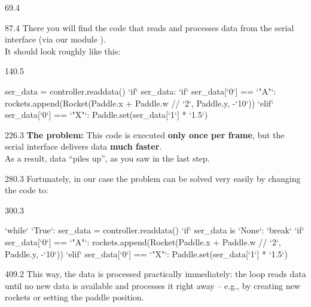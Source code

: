\documentclass{aslab}
\newcommand*\Kw[1]{\textcolor{codeorange}{#1}}  %
\newcommand*\Cy[1]{\textcolor{codecyan}{#1}}    %
\newcommand*\Nu[1]{\textcolor{codered}{#1}}     %
\begin{document}
\nextpage
\begin{region}{69.4}
\end{region}

\begin{region}[pitch=13.2]{87.4}
There you will find the code that reads and processes data from the serial
interface (via our module ).\\
It should look roughly like this:
\end{region}

\begin{region}[pitch=12]{140.5}
\begin{codeblock}[escapechar=`]
ser_data = controller.readdata()
`\Kw{if}` ser_data:
    `\Kw{if}` ser_data[`\Nu{0}`] == `\Nu{"A"}`:
        rockets.append(Rocket(Paddle.x + Paddle.w // `\Nu{2}`, Paddle.y, -`\Nu{10}`))
    `\Kw{elif}` ser_data[`\Nu{0}`] == `\Nu{"X"}`:
        Paddle.set(ser_data[`\Nu{1}`] * `\Nu{1.5}`)
\end{codeblock}
\end{region}

\begin{region}[pitch=13.8]{226.3}
\textbf{The problem:} This code is executed \textbf{only once per frame},
but the serial interface delivers data \textbf{much faster}.\\
As a result, data ``piles up'', as you saw in the last step.
\end{region}

\begin{region}{280.3}
Fortunately, in our case the problem can be solved very easily by changing
the code to:
\end{region}

\begin{region}[pitch=12]{300.3}
\begin{codeblock}[escapechar=`]
`\Kw{while}` `\Cy{True}`:
    ser_data = controller.readdata()
    `\Kw{if}` ser_data is `\Cy{None}`:
        `\Kw{break}`
    `\Kw{if}` ser_data[`\Nu{0}`] == `\Nu{"A"}`:
        rockets.append(Rocket(Paddle.x + Paddle.w // `\Nu{2}`, Paddle.y, -`\Nu{10}`))
    `\Kw{elif}` ser_data[`\Nu{0}`] == `\Nu{"X"}`:
        Paddle.set(ser_data[`\Nu{1}`] * `\Nu{1.5}`)
\end{codeblock}
\end{region}

\begin{region}[pitch=13.15]{409.2}
This way, the data is processed practically immediately: the loop reads data
until no new data is available and processes it right away -- e.g., by
creating new rockets or setting the paddle position.
\end{region}
\end{document}
